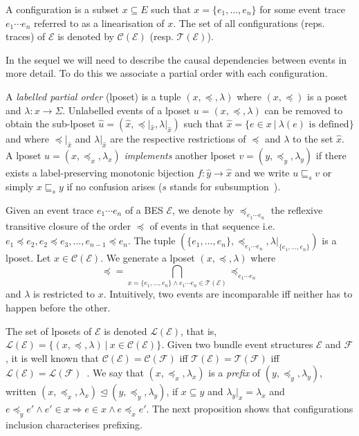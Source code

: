 \documentclass{llncs}
\newcommand{\C}{\mathcal{C}}
\renewcommand{\L}{\mathcal{L}}
\newcommand{\TT}{\mathcal{T}}
\newcommand{\EE}{\mathcal{E}}
\newcommand{\FF}{\mathcal{F}}
\newcommand{\refby}{\sqsubseteq}
\newcommand{\prefix}{\trianglelefteq}
\newcommand{\<}{\langle}
\renewcommand{\>}{\rangle}
\begin{document}
\begin{definition}\label{def:configuration}
A configuration is a subset $x\subseteq E$ such that $x=\{e_1,\dots,e_n\}$ for 
some event trace $e_1\cdots e_n$ referred to as a linearisation of $x$. The set of all configurations (reps. traces) of $\EE$ is denoted by $\C(\EE)$ (resp. $\TT(\EE)$).
\end{definition}

In the sequel we will need to describe the causal dependencies between events in more detail. To do this we associate a partial order with each configuration. 

A \emph{labelled partial order} (lposet) is a tuple $(x,\preceq,\lambda)$ where $(x,\preceq)$ is a poset and $\lambda:x\to\Sigma$. Unlabelled events of a lposet $u = (x,\preceq,\lambda)$ can be removed to obtain the sub-lposet $\hat u = (\hat{x},\preceq\!\!|_{\hat x},\lambda|_{\hat x})$ 
such that $\hat{x} = \{e\in x\ |\ \lambda(e) \textrm{ is defined}\}$ and where $\preceq\!\!|_{\hat x}$ and $\lambda|_{\hat x}$ are the respective restrictions of $\preceq$ and $\lambda$ to the set $\hat x$. 
A lposet $u = (x,\preceq_x,\lambda_x)$ \textit{implements} another lposet $v = (y,\preceq_y,\lambda_y)$ if there exists a label-preserving monotonic bijection $f:\hat{y}\to\hat{x}$ and we write $u\refby_s v$ or simply $x\refby_s y$ if no confusion arises ($s$ stands for subsumption~\cite{Gis88}). 


Given an event trace $e_1\cdots e_n$ of a BES $\EE$, we denote by $\preceq_{e_1\cdots e_n}$ the reflexive transitive closure of the order  $\preceq$ of events in that sequence i.e. $e_1\preceq e_2, e_2\preceq e_3,\dots, e_{n-1}\preceq e_n$. The tuple $(\{e_1,\dots,e_n\},\preceq_{e_1\cdots e_n},\lambda|_{\{e_1,\dots,e_n\}})$ is a lposet. Let $x\in\C(\EE)$. We generate a lposet $(x,\preceq,\lambda)$ where $$\preceq=\bigcap_{x=\{e_1,\dots,e_n\}\wedge e_1\cdots e_n\in\TT(\EE)}\preceq_{e_1\cdots e_n}$$ and $\lambda$ is restricted to $x$. Intuitively, two events are incomparable iff neither has to happen before the other. 


The set of lposets of $\EE$  is denoted $\L(\EE)$, that is, $\L(\EE) = \{(x,\preceq,\lambda)\ |\ x\in\C(\EE)\}$. Given two bundle event structures $\EE$ and $\FF$, it is well known that $\C(\EE) = \C(\FF)$ iff $\TT(\EE) = \TT(\FF)$ iff $\L(\EE) = \L(\FF)$~\cite{Kat96,Lan92}. We say that $(x,\preceq_x,\lambda_x)$ is a \emph{prefix} of $(y,\preceq_y,\lambda_y)$, written $(x,\preceq_x,\lambda_x)\prefix(y,\preceq_y,\lambda_y)$, if $x\subseteq y$ and $\lambda_y|_x = \lambda_x$ and $e\preceq_y e' \wedge e'\in x\Rightarrow e\in x\wedge e\preceq_x e'$. The next proposition shows that configurations inclusion characterises prefixing.
\end{document}
